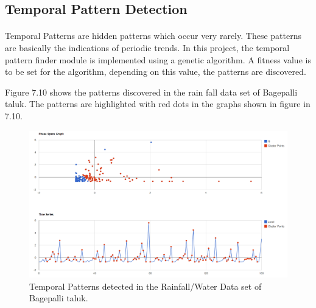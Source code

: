 \documentclass[12pt,a4paper]{report}
\begin{document}
\subsection{Temporal Pattern Detection}
\paragraph{} Temporal Patterns are hidden patterns which occur very rarely. These patterns are basically the indications of periodic trends. In this project, the temporal pattern finder module is implemented using a genetic algorithm. A fitness value is to be set for the algorithm, depending on this value, the patterns are discovered. 

Figure 7.10 shows the patterns discovered in the rain fall data set of Bagepalli taluk.  The patterns are highlighted with red dots in the graphs shown in figure in 7.10.
\begin{figure}[h!]

  \centering
    \includegraphics[scale=0.35]{./screenshots/result_tmp_pattern_Bag.png}
  \caption{Temporal Patterns detected in the Rainfall/Water Data set of Bagepalli taluk.}
\end{figure}
\end{document}
